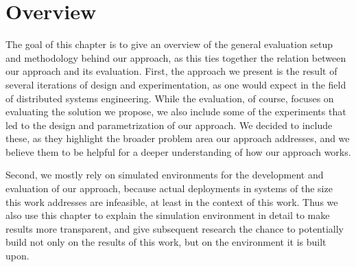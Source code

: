 \chapter{Overview}
The goal of this chapter is to give an overview of the general evaluation setup and methodology behind our approach, as this ties together the relation between our approach and its evaluation.
First, the approach we present is the result of several iterations of design and experimentation, as one would expect in the field of distributed systems engineering.
While the evaluation, of course, focuses on evaluating the solution we propose, we also include some of the experiments that led to the design and parametrization of our approach.
We decided to include these, as they highlight the broader problem area our approach addresses, and we believe them to be helpful for a deeper understanding of how our approach works.

Second, we mostly rely on simulated environments for the development and evaluation of our approach, because actual deployments in systems of the size this work addresses are infeasible, at least in the context of this work.
Thus we also use this chapter to explain the simulation environment in detail to make results more transparent, and give subsequent research the chance to potentially build not only on the results of this work, but on the environment it is built upon.



